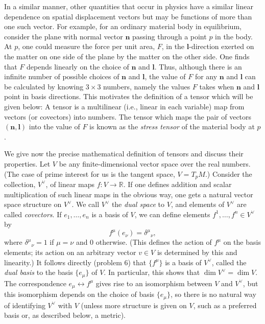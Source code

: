 In a similar manner, other quantities that occur in physics have a similar linear
dependence on spatial displacement vectors but may be functions of more than one
such vector.  For example, for an ordinary material body in equilibrium, consider
the plane with normal vector \(\mathbf{n}\) passing through a point \(p\) in the body.
At \(p\), one could measure the force per unit area, \(F\), in the \(\mathbf{l}\)-direction
exerted on the matter on one side of the plane by the matter on the other side.  One
finds that \(F\) depends linearly on the choice of \(\mathbf{n}\) and \(\mathbf{l}\).  Thus,
although there is an infinite number of possible choices of \(\mathbf{n}\) and \(\mathbf{l}\),
the value of \(F\) for any \(\mathbf{n}\) and \(\mathbf{l}\) can be calculated by knowing
\(3\times3\) numbers, namely the values \(F\) takes when \(\mathbf{n}\) and \(\mathbf{l}\)
point in basis directions.  This motivates the definition of a tensor which will be
given below: A tensor is a multilinear (i.e., linear in each variable) map from
vectors (or covectors) into numbers.  The tensor which maps the pair of vectors
\((\mathbf{n},\mathbf{l})\) into the value of \(F\) is known as the \emph{stress tensor} of
the material body at \(p\).

We give now the precise mathematical definition of tensors and discuss their
properties.  Let \(V\) be any finite-dimensional vector space over the real
numbers.  (The case of prime interest for us is the tangent space, \(V=T_pM\).)
Consider the collection, \(V^\vee\), of linear maps \(f:V\to\mathbb{R}\).  If one
defines addition and scalar multiplication of such linear maps in the obvious way,
one gets a natural vector space structure on \(V^\vee\).  We call \(V^\vee\) the
\emph{dual space} to \(V\), and elements of \(V^\vee\) are called \emph{covectors}.
If \(e_1,\ldots,e_n\) is a basis of \(V\), we can define elements
\(f^{1},\ldots,f^{n}\in V^\vee\) by
\begin{equation}
  f^{\mu}(e_\nu)=\delta^\mu{}_{\nu} ,
  \tag{2.3.1}\label{eq:2.3.1}
\end{equation}
where \(\delta^\mu{}_{\nu}=1\) if \(\mu=\nu\) and 0 otherwise.  (This defines
the action of \(f^{\mu}\) on the basis elements; its action on an arbitrary vector
\(v\in V\) is determined by this and linearity.)  It follows directly (problem 6)
that \(\{f^{\mu}\}\) is a basis of \(V^\vee\), called the \emph{dual basis} to the
basis \(\{e_\mu\}\) of \(V\).  In particular, this shows that
\(\dim V^\vee=\dim V\).  The correspondence \(e_\mu\longleftrightarrow f^{\mu}\)
gives rise to an isomorphism between \(V\) and \(V^\vee\), but this isomorphism
depends on the choice of basis \(\{e_\mu\}\), so there is no natural way of
identifying \(V^\vee\) with \(V\) (unless more structure is given on \(V\), such as a
preferred basis or, as described below, a metric).

